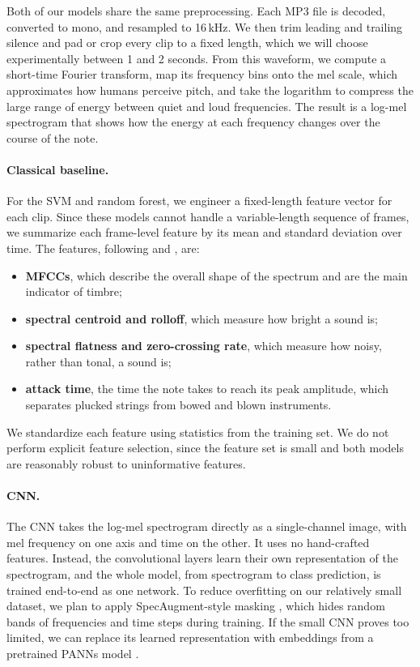 \documentclass[11pt]{article}
\begin{document}
Both of our models share the same preprocessing. Each MP3 file is decoded, converted to mono, and resampled to 16\,kHz. We then trim leading and trailing silence and pad or crop every clip to a fixed length, which we will choose experimentally between 1 and 2 seconds. From this waveform, we compute a short-time Fourier transform, map its frequency bins onto the mel scale, which approximates how humans perceive pitch, and take the logarithm to compress the large range of energy between quiet and loud frequencies. The result is a log-mel spectrogram that shows how the energy at each frequency changes over the course of the note.

\paragraph{Classical baseline.} For the SVM and random forest, we engineer a fixed-length feature vector for each clip. Since these models cannot handle a variable-length sequence of frames, we summarize each frame-level feature by its mean and standard deviation over time. The features, following \citet{eronen2000musical} and \citet{herrera2003automatic}, are:
\begin{itemize}
  \item \textbf{MFCCs}, which describe the overall shape of the spectrum and are the main indicator of timbre;
  \item \textbf{spectral centroid and rolloff}, which measure how bright a sound is;
  \item \textbf{spectral flatness and zero-crossing rate}, which measure how noisy, rather than tonal, a sound is;
  \item \textbf{attack time}, the time the note takes to reach its peak amplitude, which separates plucked strings from bowed and blown instruments.
\end{itemize}
We standardize each feature using statistics from the training set. We do not perform explicit feature selection, since the feature set is small and both models are reasonably robust to uninformative features.

\paragraph{CNN.} The CNN takes the log-mel spectrogram directly as a single-channel image, with mel frequency on one axis and time on the other. It uses no hand-crafted features. Instead, the convolutional layers learn their own representation of the spectrogram, and the whole model, from spectrogram to class prediction, is trained end-to-end as one network. To reduce overfitting on our relatively small dataset, we plan to apply SpecAugment-style masking \citep{park2019specaugment}, which hides random bands of frequencies and time steps during training. If the small CNN proves too limited, we can replace its learned representation with embeddings from a pretrained PANNs model \citep{kong2020panns}.
\end{document}
